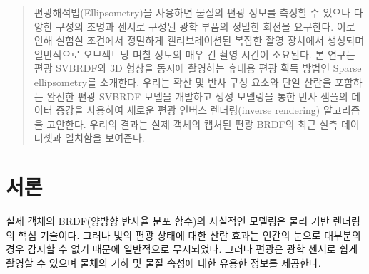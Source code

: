 \documentclass[a4paper,twocolumn]{article}
\begin{document}
\begin{abstract}
편광해석법(Ellipsometry)을 사용하면 물질의 편광 정보를 측정할 수 있으나 다양한 구성의 조명과 센서로 구성된 광학 부품의 정밀한 회전을 요구한다. 이로 인해 실험실 조건에서 정밀하게 캘리브레이션된 복잡한 촬영 장치에서 생성되며 일반적으로 오브젝트당 며칠 정도의 매우 긴 촬영 시간이 소요된다. 
본 연구는 편광 SVBRDF와 3D 형상을 동시에 촬영하는 휴대용 편광 획득 방법인 Sparse ellipsometry를 소개한다. 
우리는 확산 및 반사 구성 요소와 단일 산란을 포함하는 완전한 편광 SVBRDF 모델을 개발하고 생성 모델링을 통한 반사 샘플의 데이터 증강을 사용하여 새로운 편광 인버스 렌더링(inverse rendering) 알고리즘을 고안한다. 우리의 결과는 실제 객체의 캡처된 편광 BRDF의 최근 실측 데이터셋과 일치함을 보여준다.

\end{abstract}

%
%


\maketitle


\section{서론}
\label{sec:introduction}
실제 객체의 BRDF(양방향 반사율 분포 함수)의 사실적인 모델링은 물리 기반 렌더링의 핵심 기술이다.
그러나 빛의 편광 상태에 대한 산란 효과는 인간의 눈으로 대부분의 경우 감지할 수 없기 때문에 일반적으로 무시되었다.
그러나 편광은 광학 센서로 쉽게 촬영할 수 있으며 물체의 기하 및 물질 속성에 대한 유용한 정보를 제공한다.
\end{document}
